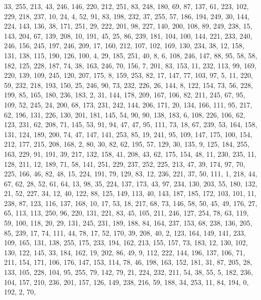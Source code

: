 \begin{DoxyCode}
       33, 255, 213, 43, 246, 146, 220, 212, 251, 83, 248, 180, 69, 87, 137, 61, 223, 102, 229, 218, 237, 10, 24, 4,
       52, 91, 83, 198, 232, 37, 255, 57, 186, 194, 249, 30, 144, 224, 143, 136, 38, 171, 251, 29, 222, 201, 98,
       227, 140, 200, 108, 89, 249, 238, 15, 143, 204, 67, 139, 208, 10, 191, 45, 25, 86, 239, 181, 104, 100, 144,
       221, 233, 240, 246, 156, 245, 197, 246, 209, 17, 160, 212, 107, 102, 169, 130, 234, 38, 12, 158, 131, 138,
       115, 190, 126, 100, 4, 29, 185, 251, 40, 8, 6, 108, 246, 147, 88, 95, 58, 58, 182, 125, 228, 187, 74, 38, 163,
       246, 70, 156, 7, 201, 83, 153, 11, 232, 113, 99, 169, 220, 139, 109, 245, 120, 207, 175, 8, 159, 253, 82,
       17, 147, 77, 103, 97, 5, 11, 220, 59, 232, 218, 193, 150, 25, 246, 90, 73, 232, 226, 26, 144, 8, 122, 154, 73,
       56, 228, 199, 85, 165, 180, 236, 183, 2, 31, 144, 178, 209, 167, 106, 82, 211, 245, 67, 95, 109, 52, 245,
       24, 200, 68, 173, 231, 242, 144, 206, 171, 20, 134, 166, 111, 95, 217, 62, 196, 131, 226, 130, 201, 181, 145,
       54, 90, 90, 138, 183, 6, 108, 226, 106, 62, 123, 231, 62, 208, 71, 145, 53, 91, 94, 47, 47, 95, 111, 73,
       18, 67, 239, 53, 164, 158, 131, 124, 189, 200, 74, 47, 147, 141, 253, 85, 19, 241, 95, 109, 147, 175, 100,
       154, 212, 177, 215, 208, 168, 2, 80, 30, 82, 62, 195, 57, 129, 30, 135, 9, 125, 184, 255, 163, 229, 91, 191,
       39, 217, 132, 158, 41, 208, 43, 62, 175, 154, 48, 11, 230, 235, 11, 128, 211, 12, 189, 71, 58, 141, 251, 229,
       237, 252, 225, 213, 47, 39, 174, 97, 70, 225, 166, 46, 82, 48, 15, 224, 191, 79, 129, 83, 12, 236, 221, 37,
       50, 111, 1, 218, 44, 67, 62, 28, 52, 61, 64, 13, 98, 35, 224, 137, 173, 43, 97, 234, 130, 203, 55, 180, 132,
       21, 52, 227, 34, 12, 40, 122, 88, 125, 149, 113, 40, 143, 187, 185, 172, 103, 101, 11, 238, 87, 123, 116,
       137, 168, 10, 17, 53, 18, 217, 68, 73, 146, 58, 50, 45, 49, 176, 27, 65, 113, 113, 250, 96, 220, 131, 221,
       83, 45, 105, 211, 246, 127, 254, 78, 63, 119, 59, 100, 118, 20, 29, 131, 245, 231, 189, 188, 84, 164, 237,
       153, 68, 238, 136, 205, 85, 239, 17, 74, 111, 44, 78, 17, 52, 170, 39, 208, 40, 2, 123, 164, 149, 141, 233,
       109, 165, 131, 138, 255, 175, 233, 194, 162, 213, 155, 157, 73, 183, 12, 130, 102, 130, 122, 145, 33, 184, 162,
       19, 202, 86, 49, 9, 112, 222, 144, 196, 137, 106, 71, 211, 154, 171, 106, 176, 147, 153, 114, 78, 46, 198,
       163, 152, 181, 31, 87, 205, 28, 133, 105, 228, 104, 95, 255, 79, 142, 79, 21, 224, 232, 211, 54, 38, 55, 5,
       182, 236, 104, 157, 210, 236, 201, 157, 126, 149, 238, 216, 59, 188, 34, 253, 11, 84, 194, 0, 192, 2, 70,

\end{DoxyCode}
